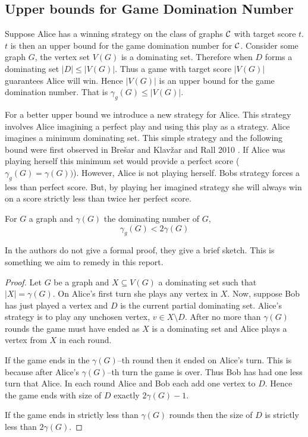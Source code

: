 \subsection{Upper bounds for Game Domination Number}
Suppose Alice has a winning strategy on the class of graphs $\mathcal{C}$ with target score $t$. $t$ is then an upper bound for the game domination number for $\mathcal{C}$. Consider some graph $G$, the vertex set $V(G)$ is a dominating set. Therefore when $D$ forms a dominating set $|D|\leq |V(G)|$. Thus a game with target score $|V(G)|$ guarantees Alice will win. Hence $|V(G)|$ is an upper bound for the game domination number. That is $\gamma_g(G) \leq |V(G)|$. 

For a better upper bound we introduce a new strategy for Alice. This strategy involves Alice imagining a perfect play and using this play as a strategy. Alice imagines a minimum dominating set. This simple strategy and the following bound were first observed in Bre\v{s}ar and Klav\v{z}ar and Rall 2010 \cite{BrKlRa2010}. If Alice was playing herself this minimum set would provide a perfect score ($\gamma_g(G)=\gamma(G))$). However, Alice is not playing herself. Bobs strategy forces a less than perfect score. But, by playing her imagined strategy she will always win on a score strictly less than twice her perfect score.

\begin{theorem}\label{thm:gamedomup}
    For $G$ a graph and $\gamma(G)$ the dominating number of $G$,  
    \[\gamma_g(G)<2\gamma(G)\]
\end{theorem}
In \cite{BrKlRa2010} the authors do not give a formal proof, they give a brief sketch. This is something we aim to remedy in this report. 
\begin{proof}
    Let $G$ be a graph and $X\subseteq V(G)$ a dominating set such that $|X| = \gamma(G)$. On Alice's first turn she plays any vertex in $X$. Now, suppose Bob has just played a vertex and $D$ is the current partial dominating set. Alice's strategy is to play any unchosen vertex, $v\in X\setminus D$. After no more than $\gamma(G)$ rounds the game must have ended as $X$ is a dominating set and Alice plays a vertex from $X$ in each round. 
    
    If the game ends in the $\gamma(G)$--th round then it ended on Alice's turn. This is because after Alice's $\gamma(G)$--th turn the game is over. Thus Bob has had one less turn that Alice. In each round Alice and Bob each add one vertex to $D$. Hence the game ends with size of $D$ exactly $2\gamma(G) -1$. 
    
    If the game ends in strictly less than $\gamma(G)$ rounds then the size of $D$ is strictly less than $2\gamma(G)$.
\end{proof}

